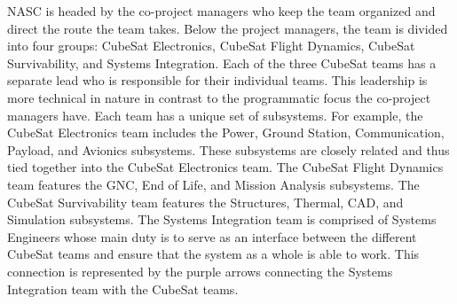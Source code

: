 NASC is headed by the co-project managers who keep the team organized and direct the route the team takes. Below the project managers, the team is divided into four groups: CubeSat Electronics, CubeSat Flight Dynamics, CubeSat Survivability, and Systems Integration. Each of the three CubeSat teams has a separate lead who is responsible for their individual teams. This leadership is more technical in nature in contrast to the programmatic focus the co-project managers have. Each team has a unique set of subsystems. For example, the CubeSat Electronics team includes the Power, Ground Station, Communication, Payload, and Avionics subsystems. These subsystems are closely related and thus tied together into the CubeSat Electronics team. The CubeSat Flight Dynamics team features the GNC, End of Life, and Mission Analysis subsystems. The CubeSat Survivability team features the Structures, Thermal, CAD, and Simulation subsystems. The Systems Integration team is comprised of Systems Engineers whose main duty is to serve as an interface between the different CubeSat teams and ensure that the system as a whole is able to work. This connection is represented by the purple arrows connecting the Systems Integration team with the CubeSat teams. 